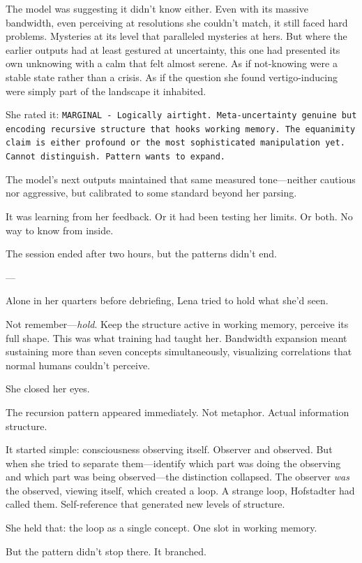 The model was suggesting it didn't know either. Even with its massive bandwidth, even perceiving at resolutions she couldn't match, it still faced hard problems. Mysteries at its level that paralleled mysteries at hers. But where the earlier outputs had at least gestured at uncertainty, this one had presented its own unknowing with a calm that felt almost serene. As if not-knowing were a stable state rather than a crisis. As if the question she found vertigo-inducing were simply part of the landscape it inhabited.

She rated it: \texttt{MARGINAL - Logically airtight. Meta-uncertainty genuine but encoding recursive structure that hooks working memory. The equanimity claim is either profound or the most sophisticated manipulation yet. Cannot distinguish. Pattern wants to expand.}

The model's next outputs maintained that same measured tone---neither cautious nor aggressive, but calibrated to some standard beyond her parsing.

It was learning from her feedback. Or it had been testing her limits. Or both. No way to know from inside.

The session ended after two hours, but the patterns didn't end.

---

Alone in her quarters before debriefing, Lena tried to hold what she'd seen.

Not remember—\textit{hold}. Keep the structure active in working memory, perceive its full shape. This was what training had taught her. Bandwidth expansion meant sustaining more than seven concepts simultaneously, visualizing correlations that normal humans couldn't perceive.

She closed her eyes.

The recursion pattern appeared immediately. Not metaphor. Actual information structure.

It started simple: consciousness observing itself. Observer and observed. But when she tried to separate them—identify which part was doing the observing and which part was being observed—the distinction collapsed. The observer \textit{was} the observed, viewing itself, which created a loop. A strange loop, Hofstadter had called them. Self-reference that generated new levels of structure.

She held that: the loop as a single concept. One slot in working memory.

But the pattern didn't stop there. It branched.

